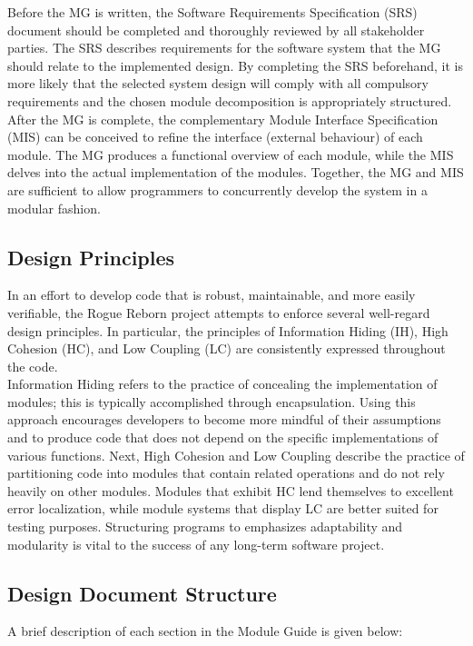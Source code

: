 \documentclass[12pt, titlepage]{article}
\begin{document}
        Before the MG is written, the Software Requirements Specification (SRS) document should be completed and thoroughly reviewed by all stakeholder parties.  The SRS describes requirements for the software system that the MG should relate to the implemented design.  By completing the SRS beforehand, it is more likely that the selected system design will comply with all compulsory requirements and the chosen module decomposition is appropriately structured.\\

        After the MG is complete, the complementary Module Interface Specification (MIS) can be conceived to refine the interface (external behaviour) of each module.  The MG produces a functional overview of each module, while the MIS delves into the actual implementation of the modules.  Together, the MG and MIS are sufficient to allow programmers to concurrently develop the system in a modular fashion.  
    
    \subsection{Design Principles}
        In an effort to develop code that is robust, maintainable, and more easily verifiable, the Rogue Reborn project attempts to enforce several well-regard design principles.  In particular, the principles of Information Hiding (IH), High Cohesion (HC), and Low Coupling (LC) are consistently expressed throughout the code.\\

        Information Hiding refers to the practice of concealing the implementation of modules; this is typically accomplished through encapsulation.  Using this approach encourages developers to become more mindful of their assumptions and to produce code that does not depend on the specific implementations of various functions.  Next, High Cohesion and Low Coupling describe the practice of partitioning code into modules that contain related operations and do not rely heavily on other modules.  Modules that exhibit HC lend themselves to excellent error localization, while module systems that display LC are better suited for testing purposes.  Structuring programs to emphasizes adaptability and modularity is vital to the success of any long-term software project.

    \subsection{Design Document Structure}
        A brief description of each section in the Module Guide is given below:
\end{document}
